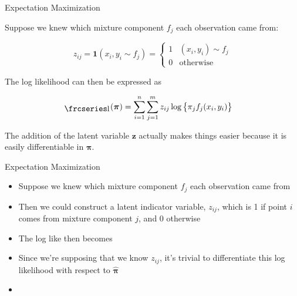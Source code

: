 \documentclass{beamer}
\newcommand{\textfrc}[1]{{\frcseries#1}}
\newcommand{\mathfrc}[1]{\raisebox{-0.8mm}{\text{\textfrc{\small #1}}}\hspace{0.4mm}}
\newcommand{\eqn}[1]{\begin{align*}
#1
\end{align*}}
\newcommand{\vect}[1]{\boldsymbol{\mathbf{#1}}}
\newcommand{\bl}{\big\{}
\newcommand{\br}{\big\}}
\newcommand{\eqnset}[4]{
\[ #1 = #2 \left\{ \begin{array}{#3}
        #4
\end{array} \right. \] 
}
\newcommand{\indicator}{\mathbf{1}}
\newcommand{\vp}{\vect{\pi}}
\newcommand{\vph}{\hat{\vect{\pi}}}
\newcommand{\sumn}{\sum^n_{i=1}}
\newcommand{\summ}{\sum^m_{j=1}}
\newcommand{\fab}{f_j}
\newcommand{\llp}{\mathfrc{l}(\vect{\pi})}
\begin{document}
\begin{frame}{Expectation Maximization}
	
	Suppose we knew which mixture component $f_j$ each observation came from:
	
	\eqnset{z_{ij} = \indicator(x_i,y_i \sim f_j) }{}{ll}{
		1			& (x_i,y_i) \sim f_j 		\\
		0		& \text{otherwise}
	}
	
	The log likelihood can then be expressed as
	
	\eqn{
		\llp &= \sumn \summ z_{ij}  \log \bl \pi_j  \fab(x_i,y_i) \br
	}
	
	The addition of the latent variable $\vect{z}$ actually makes things easier because it is easily differentiable in $\vp$.
	
\end{frame}
\begin{frame}[shrink]{Expectation Maximization}
	
	\begin{itemize}
		\item Suppose we knew which mixture component $f_j$ each observation came from
		\item Then we could construct a latent indicator variable, $z_{ij}$, which is 1 if point $i$ comes from mixture component $j$, and 0 otherwise
		\item The log like then becomes
		\item Since we're supposing that we know $z_{ij}$, it's trivial to differentiate this log likelihood with respect to $\vph$
		\item 
	\end{itemize}
	
\end{frame}
\end{document}
